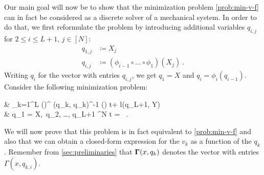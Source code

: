 Our main goal will now be to show that the minimization problem \ref{prob:min-v-f} can in fact be considered as a discrete solver of a mechanical system.
In order to do that, we first reformulate the problem by introducing additional variables $q_{i,j}$ for $2 \leq i \leq L+1$, $j \in [N]$:
\begin{align}
	q_{1, j} &\coloneqq X_j \, \\
	q_{i, j} &\coloneqq (\phi_{i-1} \circ \ldots \circ \phi_1) (X_j) \ .
\end{align}
Writing $q_i$ for the vector with entries $q_{i,j}$, we get $q_1 = X$ and $q_i = \phi_i(q_{i-1})$.
Consider the following minimization problem:
\begin{problem}
	\label{prob:min-q}
	\begin{cases}
		 & \nu \cdot {} \sum_{k=1}^{L} \left(\right)^ \bGamma(q_k, q_k)^{-1} \left(\right) \Delta t+ l(q_{L+1}, Y) \\
		 & q_1 = X,\ q_2, \ldots, q_{L+1} \in \cX^N   \Delta t =  \ .
	\end{cases}
\end{problem}
We will now prove that this problem is in fact equivalent to \cref{prob:min-v-f} and also that we can obtain a closed-form expression for the $v_k$ as a function of the $q_k$.
Remember from \cref{sec:preliminaries} that $\mathbf{\Gamma}(x, q_k)$ denotes the vector with entries $\Gamma(x, q_{k,i})$.

